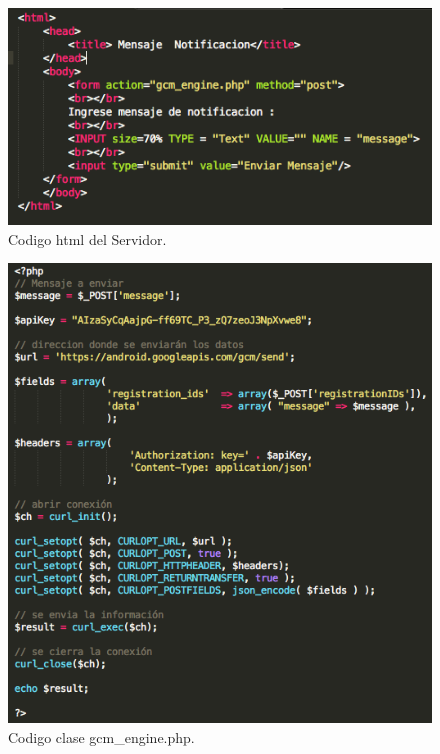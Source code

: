 \begin{figure}[H]
\centering
\includegraphics[scale=0.50]{images/capitulo5/codigoServidor.png}
\caption{Codigo html del Servidor.}
\label{codigoServidor}
\end{figure}

\begin{figure}[H]
\centering
\includegraphics[scale=0.50]{images/capitulo5/codigoGCM.png}
\caption{Codigo clase gcm\_engine.php.}
\label{codigoPHP}
\end{figure}

